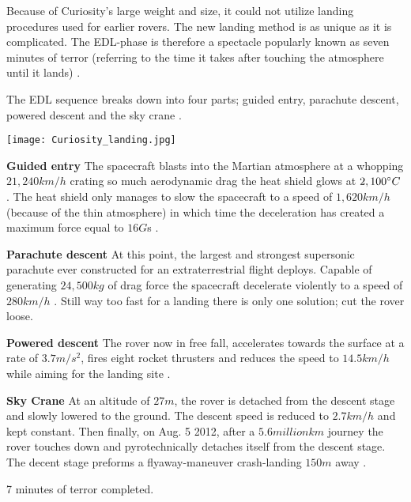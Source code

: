 \begin{tcolorbox}[colback=red!5,colframe=DarkRed!40!black,title=Entry\, Descent and Landing (EDL)]
Because of Curiosity’s large weight and size, it could not utilize landing procedures used for earlier rovers.
The new landing method is as unique as it is complicated.
The EDL-phase is therefore a spectacle popularly known as seven minutes of terror (referring to the time it takes after touching the atmosphere until it lands) \cite{CNN_7minterror}. 

The EDL sequence breaks down into four parts; guided entry, parachute descent, powered descent and the sky crane \cite{NASALanding}.

{\centering
\texttt{[image: Curiosity\_landing.jpg]}
\par}

\textbf{Guided entry}
The spacecraft blasts into the Martian atmosphere at a whopping $21,240km/h$ crating so much aerodynamic drag the heat shield glows at $2,100\degree C$ \cite{NASA_youtube}.
The heat shield only manages to slow the spacecraft to a speed of $1,620km/h$ (because of the thin atmosphere) in which time the deceleration has created a maximum force equal to $16G$s \cite{HistoricLanding} \cite{NASALanding}.

\textbf{Parachute descent}
At this point, the largest and strongest supersonic parachute ever constructed for an extraterrestrial flight deploys. Capable of generating $24,500kg$ of drag force the spacecraft decelerate violently to a speed of $280km/h$ \cite{Parachute} \cite{NASALanding}.
Still way too fast for a landing there is only one solution; cut the rover loose.

\textbf{Powered descent}
The rover now in free fall, accelerates towards the surface at a rate of $3.7m/s^{2}$, fires eight rocket thrusters and reduces the speed to $14.5km/h$ while aiming for the landing site \cite{HistoricLanding} \cite{NASALanding}. 

\textbf{Sky Crane}
At an altitude of $27m$, the rover is detached from the descent stage and slowly lowered to the ground.
The descent speed is reduced to $2.7km/h$ and kept constant.
Then finally, on Aug. 5 2012, after a $5.6 million km$ \cite{CNNCuriosity} journey the rover touches down and pyrotechnically detaches itself from the descent stage.
The decent stage preforms a flyaway-maneuver crash-landing $150m$ away \cite{HistoricLanding} \cite{NASALanding}. 

7 minutes of terror completed.
\end{tcolorbox}